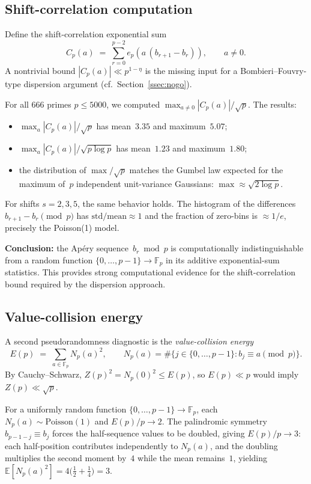 \documentclass[11pt]{article}
\theoremstyle{definition}
\theoremstyle{remark}
\begin{document}
\subsection{Shift-correlation computation}\label{ssec:shift}

Define the shift-correlation exponential sum
\[
  C_p(a) \;=\; \sum_{r=0}^{p-2} e_p\!\left(
  a\,(b_{r+1} - b_r)\right), \qquad a \ne 0.
\]
A nontrivial bound $|C_p(a)| \ll p^{1-\eta}$
is the missing input for a Bombieri--Fouvry-type
dispersion argument (cf.\ Section~\ref{ssec:nogo}).

For all $666$ primes $p \le 5000$, we computed
$\max_{a \ne 0} |C_p(a)|/\sqrt{p}$.
The results:
\begin{itemize}
\item $\max_a |C_p(a)|/\sqrt{p}$
  has mean~$3.35$ and maximum~$5.07$;
\item $\max_a |C_p(a)|/\sqrt{p \log p}$
  has mean~$1.23$ and maximum~$1.80$;
\item the distribution of $\max/\sqrt{p}$ matches
  the Gumbel law expected for the maximum
  of~$p$ independent unit-variance Gaussians:
  $\max \approx \sqrt{2 \log p}$.
\end{itemize}
For shifts $s = 2, 3, 5$, the same behavior holds.
The histogram of the differences
$b_{r+1} - b_r \pmod{p}$
has $\mathrm{std}/\mathrm{mean} \approx 1$
and the fraction of zero-bins is
$\approx 1/e$, precisely the Poisson(1) model.

\textbf{Conclusion:} the Ap\'ery sequence~$b_r \bmod p$
is computationally indistinguishable from a random
function $\{0, \ldots, p{-}1\} \to \mathbb{F}_p$
in its additive exponential-sum statistics.
This provides strong computational evidence for the
shift-correlation bound required by the
dispersion approach.

\subsection{Value-collision energy}\label{ssec:collision-energy}

A second pseudorandomness diagnostic is
the \emph{value-collision energy}
\[
  E(p)
  \;=\;
  \sum_{a \in \mathbb{F}_p} N_p(a)^2,
  \qquad
  N_p(a) = \#\{j \in \{0, \ldots, p{-}1\} : b_j \equiv a \pmod{p}\}.
\]
By Cauchy--Schwarz, $Z(p)^2 = N_p(0)^2 \le E(p)$,
so $E(p) \ll p$ would imply
$Z(p) \ll \sqrt{p}$.

For a uniformly random function
$\{0, \ldots, p{-}1\} \to \mathbb{F}_p$,
each $N_p(a) \sim \mathrm{Poisson}(1)$
and $E(p)/p \to 2$.
The palindromic symmetry
$b_{p-1-j} \equiv b_j$
forces the half-sequence values to be doubled,
giving $E(p)/p \to 3$:
each half-position contributes independently
to $N_p(a)$, and the doubling multiplies
the second moment by~$4$ while the mean
remains~$1$, yielding
$\mathbb{E}[N_p(a)^2] = 4\bigl(\tfrac{1}{2} + \tfrac{1}{4}\bigr) = 3$.
\end{document}
